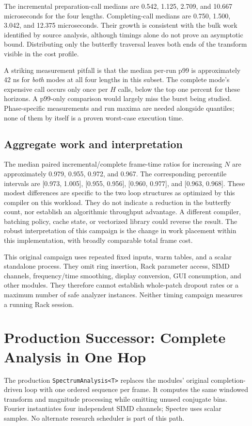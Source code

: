 \documentclass[11pt,letterpaper]{article}
\newcommand{\code}[1]{\texttt{#1}}
\begin{document}
The incremental preparation-call medians are 0.542, 1.125, 2.709, and
10.667 microseconds for the four lengths. Completing-call medians are 0.750,
1.500, 3.042, and 12.375 microseconds. Their growth is consistent with the bulk
work identified by source analysis, although timings alone do not prove an
asymptotic bound. Distributing only the butterfly traversal leaves both ends of
the transform visible in the cost profile.

A striking measurement pitfall is that the median per-run p99 is approximately
42 ns for \emph{both} modes at all four lengths in this subset. The complete
mode's expensive call occurs only once per $H$ calls, below the top one percent
for these horizons. A p99-only comparison would largely miss the burst being
studied. Phase-specific measurements and run maxima are needed alongside
quantiles; none of them by itself is a proven worst-case execution time.

\subsection{Aggregate work and interpretation}
The median paired incremental/complete frame-time ratios for increasing $N$
are approximately 0.979, 0.955, 0.972, and 0.967. The corresponding percentile
intervals are [0.973, 1.005], [0.955, 0.956], [0.960, 0.977], and
[0.963, 0.968]. These modest differences are specific to the two loop structures
as optimized by this compiler on this workload. They do not indicate a reduction
in the butterfly count, nor establish an algorithmic throughput advantage. A
different compiler, batching policy, cache state, or vectorized library could
reverse the result. The robust interpretation of this campaign is the change
in work placement within this implementation, with broadly comparable total
frame cost.

This original campaign uses repeated fixed inputs, warm tables, and a scalar standalone
process. They omit ring insertion, Rack parameter access, SIMD channels,
frequency/time smoothing, display conversion, GUI consumption, and other
modules. They therefore cannot establish whole-patch dropout rates or a maximum
number of safe analyzer instances. Neither timing campaign measures a running Rack session.

\section{Production Successor: Complete Analysis in One Hop}
\label{sec:one-hop}
The production \code{SpectrumAnalysis<T>} replaces the modules' original
completion-driven loop with one ordered sequence per frame. It computes the
same windowed transform and magnitude processing while omitting unused
conjugate bins. Fourier instantiates four independent SIMD channels; Spectre
uses scalar samples. No alternate research scheduler is part of this path.
\end{document}

